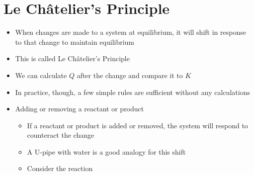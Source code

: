 \documentclass[12pt, openany, letterpaper]{memoir}
\begin{document}
\section{Le Ch\^atelier's Principle}
\begin{itemize}
	\item When changes are made to a system at equilibrium, it will shift in response to that change to maintain equilibrium
	\item This is called Le Ch\^atelier's Principle
	\item We can calculate $Q$ after the change and compare it to $K$
	\item In practice, though, a few simple rules are sufficient without any calculations
	\item Adding or removing a reactant or product
	\begin{itemize}
		\item If a reactant or product is added or removed, the system will respond to counteract the change
		\item A U-pipe with water is a good analogy for this shift
		\item Consider the reaction 
		

\end{itemize}
\end{itemize}
\end{document}
